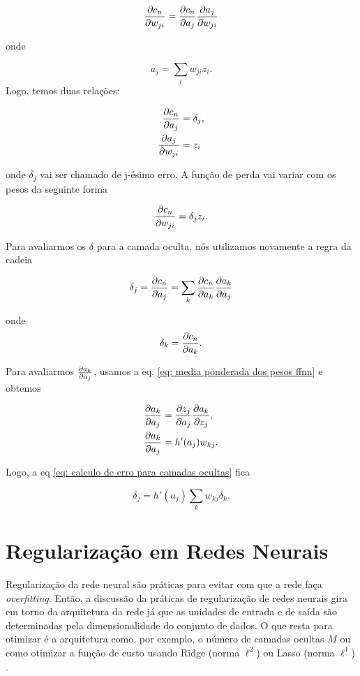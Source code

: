 \documentclass[12pt,titlepage]{article}
\begin{document}
\begin{equation}
	\pdv{c_n}{w_{ji}} = \pdv{c_n}{a_j} \pdv{a_j}{w_{ji}}
\end{equation}

onde 

\begin{equation}
	a_j = \sum_i w_{ji} z_i.
\end{equation}
Logo, temos duas relações:

\begin{align}
	\pdv{c_n}{a_j} &= \delta_j,\\
	\pdv{a_j}{w_{ji}} &= z_i
\end{align}

onde $\delta_j$ vai ser chamado de j-ésimo erro. A função de perda vai variar com os pesos da seguinte forma

\begin{equation}
	\pdv{c_n}{w_{ji}} = \delta_j z_i.
\end{equation}

Para avaliarmos os $\delta$ para a camada oculta, nós utilizamos novamente a regra da cadeia

\begin{equation}
	\label{eq: calculo de erro para camadas ocultas}
	\delta_j = \pdv{c_n}{a_j} = \sum_k \pdv{c_n}{a_k}\pdv{a_k}{a_j}
\end{equation}

onde \begin{equation}
	\delta_k = \pdv{c_n}{a_k}.
\end{equation}

Para avaliarmos $\pdv{a_k}{a_j}$, usamos a eq. \eqref{eq: media ponderada dos pesos ffnn} e obtemos

\begin{align}
	\pdv{a_k}{a_j} &= \pdv{z_j}{a_j}\pdv{a_k}{z_j},\\
	\pdv{a_k}{a_j} &= h'(a_j) w_{kj}.
\end{align}

Logo, a eq \eqref{eq: calculo de erro para camadas ocultas} fica \cite{bishop2006}

\begin{equation}
	\label{eq: formula backpropagation}
	\delta_j = h'(a_j) \sum_k w_{kj}\delta_k.
\end{equation}

\section{Regularização em Redes Neurais}

Regularização da rede neural são práticas para evitar com que a rede faça \textit{overfitting}. Então, a discussão da práticas de regularização de redes neurais gira em torno da arquitetura da rede já que as unidades de entrada e de saída são determinadas pela dimensionalidade do conjunto de dados. O que resta para otimizar é a arquitetura como, por exemplo, o número de camadas ocultas $M$ ou como otimizar a função de custo usando Ridge (norma $\ell^2$) ou Lasso (norma $\ell^1$)  \cite{bishop2006}.

\newpage
\printbibliography
\end{document}
